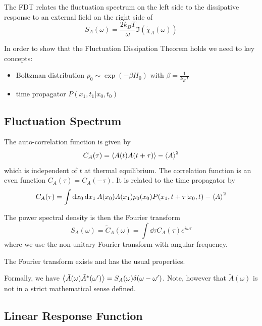 \documentclass{notebook}
\begin{document}
\begin{theorem}
	The FDT relates the fluctuation spectrum on the left side to the dissipative response to an external field on the right side of
	\begin{equation}
	S_A(\omega) = \frac{2 k_B T}{\omega} \Im (\tilde{\chi}_A(\omega))
	\end{equation}
\end{theorem}

In order to show that the Fluctuation Dissipation Theorem holds we need to key concepts:
%
\begin{itemize}
	\item{Boltzman distribution $p_0 \sim \exp(- \beta H_0)$ with $\beta = \frac{1}{k_B T}$}
	\item{time propagator $P(x_1, t_1 | x_0, t_0)$}
\end{itemize}

 
\subsection*{Fluctuation Spectrum}

The auto-correlation function is given by
%
\begin{equation}
	C_A(\tau) = \expval{A(t) A(t+\tau)} - \expval{A}^2
\end{equation}
%
which is independent of $t$ at thermal equilibrium. The correlation function is an even function $C_A(\tau) = C_A(-\tau)$. It is related to the time propagator by 
%
\begin{equation}
C_A(\tau) = \int \dd{x_0} \dd{x_1} A(x_0) A(x_1) p_0(x_0) P(x_1, t+\tau | x_0, t) - \expval{A}^2
\end{equation}
%

The power spectral density is then the Fourier transform
%
\begin{equation}
	S_A(\omega) = \tilde{C}_A(\omega) = \int \dd{\tau} C_A(\tau) e^{i \omega \tau}
\end{equation}
%
where we use the non-unitary Fourier transform with angular frequency. 
%
\begin{theorem}
	The Fourier transform exists and has the usual properties.
\end{theorem}
%
Formally, we have $\expval{\tilde{A}(\omega) \tilde{A}^*(\omega')} = S_A(\omega) \delta(\omega - \omega')$. Note, however that $\tilde{A}(\omega)$ is not in a strict mathematical sense defined.

\subsection*{Linear Response Function}
\end{document}
